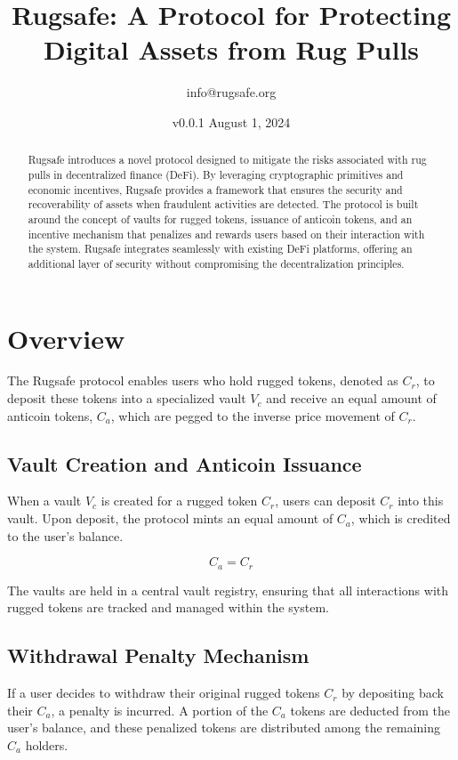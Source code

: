 \documentclass{article}
\title{Rugsafe: A Protocol for Protecting Digital Assets from Rug Pulls}
\author{info@rugsafe.org}
\date{v0.0.1 August 1, 2024}
\begin{document}
\maketitle

\begin{abstract}
Rugsafe introduces a novel protocol designed to mitigate the risks associated with rug pulls in decentralized finance (DeFi). By leveraging cryptographic primitives and economic incentives, Rugsafe provides a framework that ensures the security and recoverability of assets when fraudulent activities are detected. The protocol is built around the concept of vaults for rugged tokens, issuance of anticoin tokens, and an incentive mechanism that penalizes and rewards users based on their interaction with the system. Rugsafe integrates seamlessly with existing DeFi platforms, offering an additional layer of security without compromising the decentralization principles.
\end{abstract}



\section{Overview}

The Rugsafe protocol enables users who hold rugged tokens, denoted as $C_r$, to deposit these tokens into a specialized vault $V_c$ and receive an equal amount of anticoin tokens, $C_a$, which are pegged to the inverse price movement of $C_r$.

\subsection{Vault Creation and Anticoin Issuance}
When a vault $V_c$ is created for a rugged token $C_r$, users can deposit $C_r$ into this vault. Upon deposit, the protocol mints an equal amount of $C_a$, which is credited to the user's balance.

\begin{equation}
C_a = C_r
\end{equation}

The vaults are held in a central vault registry, ensuring that all interactions with rugged tokens are tracked and managed within the system.

\subsection{Withdrawal Penalty Mechanism}
If a user decides to withdraw their original rugged tokens $C_r$ by depositing back their $C_a$, a penalty is incurred. A portion of the $C_a$ tokens are deducted from the user's balance, and these penalized tokens are distributed among the remaining $C_a$ holders.
\end{document}
